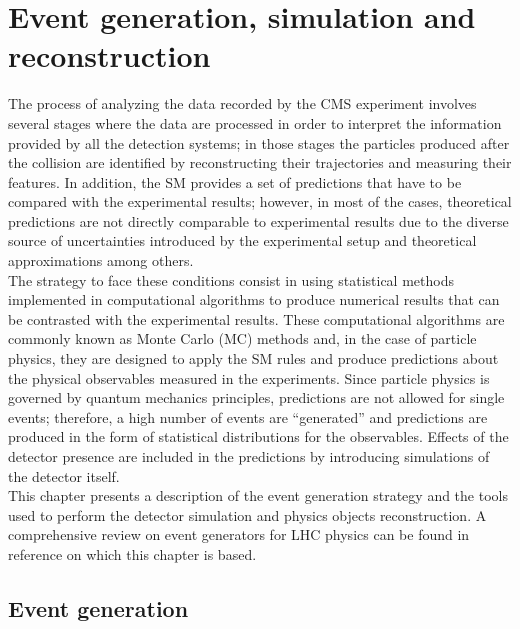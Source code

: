 \chapter{Event generation, simulation and reconstruction}\label{ch:gensimreco}

\noindent The process of analyzing the data recorded by the CMS experiment involves several stages where the data are processed in order to interpret the information provided by all the detection systems; in those stages the particles produced after the \pp collision are identified by reconstructing their trajectories and measuring their features. In addition, the SM provides a set of predictions that have to be compared with the experimental results; however, in most of the cases, theoretical predictions are not directly comparable to experimental results due to the diverse source of uncertainties introduced by the experimental setup and theoretical approximations among others.\\

\noindent The strategy to face these conditions consist in using statistical methods implemented in computational algorithms to produce numerical results that can be contrasted with the experimental results. These computational algorithms are commonly known as Monte Carlo (MC) methods and, in the case of particle physics, they are designed to apply the SM rules and produce predictions about the physical observables measured in the experiments. Since particle physics is governed by quantum mechanics principles, predictions are not allowed for single events; therefore, a high number of events are ``generated'' and predictions are produced in the form of statistical distributions for the observables. Effects of the detector presence are included in the predictions by introducing simulations of the detector itself.\\     

\noindent This chapter presents a description of the event generation strategy and the tools used to perform the detector simulation and physics objects reconstruction. A comprehensive review on event generators for LHC physics can be found in reference \cite{gen} on which this chapter is based.  

\section{Event generation}

